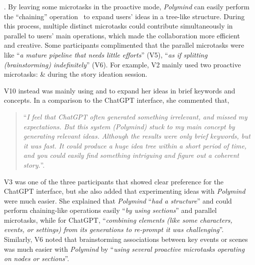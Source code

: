 . By leaving some microtasks in the proactive mode, \textit{Polymind} can easily perform the ``chaining'' operation~\cite{wu2022ai} to expand users' ideas in a tree-like structure. During this process, multiple distinct microtasks could contribute simultaneously in parallel to users' main operations, which made the collaboration more efficient and creative.
Some participants complimented that the parallel microtasks were like ``\textit{a mature pipeline that needs little efforts}'' (V5), ``\textit{as if splitting (brainstorming) indefinitely}'' (V6). For example, V2 mainly used two proactive microtasks: \FboxS{\textcolor{white}{Freewrite}} \& \SboxS{\textcolor{white}{Summarise}} during the story ideation session.

V10 instead was mainly using \BboxS{\textcolor{white}{Brainstorm}} and \EboxS{\textcolor{white}{Elaborate}} to expand her ideas in brief keywords and concepts.  In a comparison to the ChatGPT interface, she commented that,
\begin{quote}
    ``\textit{I feel that ChatGPT often generated something irrelevant, and missed my expectations. But this system (Polymind) stuck to my main concept by generating relevant ideas. Although the results were only brief keywords, but it was fast. It could produce a huge idea tree within a short period of time, and you could easily find something intriguing and figure out a coherent story.}''.
\end{quote}



V3 was one of the three participants that showed clear preference for the ChatGPT interface, but she also added that experimenting ideas with \textit{Polymind} were much easier. She explained that \textit{Polymind} ``\textit{had a structure}'' and could perform chaining-like operations easily ``\textit{by using sections}'' and parallel microtasks, while for ChatGPT, ``\textit{combining elements (like some characters, events, or settings) from its generations to re-prompt it was challenging}''. Similarly, V6 noted that brainstorming associations between key events or scenes was much easier with \textit{Polymind} by ``\textit{using several proactive microtasks operating on nodes or sections}''.


